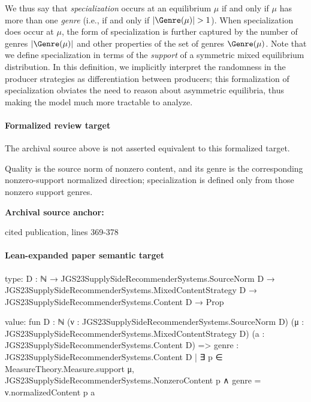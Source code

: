 \documentclass[10pt]{article}
\begin{document}
\begin{ReviewVerbatim}
We thus say that \textit{specialization} occurs at an equilibrium $\mu$ if and only if $\mu$ has more than one \textit{genre} (i.e., if and only if $|\Genre(\mu)| > 1$). When specialization does occur at $\mu$, the form of specialization is further captured by the number of genres $|\Genre(\mu)|$ and other properties of the set of genres $\Genre(\mu)$. Note that we define specialization in terms of the \textit{support} of a symmetric mixed equilibrium distribution. In this definition, we implicitly interpret the randomness in the producer strategies as differentiation between producers; this formalization of specialization obviates the need to reason about asymmetric equilibria, thus making the model much more tractable to analyze.
\end{ReviewVerbatim}


\paragraph{Formalized review target}
The archival source above is not asserted equivalent to this formalized target.
\begin{ReviewVerbatim}
Quality is the source norm of nonzero content, and its genre is the corresponding nonzero-support normalized direction; specialization is defined only from those nonzero support genres.
\end{ReviewVerbatim}

\textbf{Archival source anchor:} {\footnotesize\raggedright cited publication, lines 369-\allowbreak{}378\par}
\paragraph{Lean-expanded paper semantic target}
\begin{ReviewVerbatim}
type:
{D : ℕ} →
  JGS23SupplySideRecommenderSystems.SourceNorm D →
    JGS23SupplySideRecommenderSystems.MixedContentStrategy D → JGS23SupplySideRecommenderSystems.Content D → Prop

value:
fun {D : ℕ} (ν : JGS23SupplySideRecommenderSystems.SourceNorm D)
    (μ : JGS23SupplySideRecommenderSystems.MixedContentStrategy D) (a : JGS23SupplySideRecommenderSystems.Content D) =>
  {genre : JGS23SupplySideRecommenderSystems.Content D |
      ∃ p ∈ MeasureTheory.Measure.support μ,
        JGS23SupplySideRecommenderSystems.NonzeroContent p ∧ genre = ν.normalizedContent p}
    a
\end{ReviewVerbatim}
\end{document}
